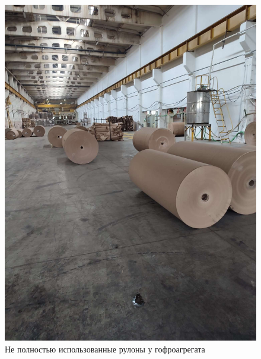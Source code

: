 \begin{figure}
\begin{center}
  \includegraphics[height=0.8\textheight, width=\textwidth, keepaspectratio]{Pics/d_Stock.JPEG}
\end{center}
  \caption{Не полностью использованные рулоны у гофроагрегата}
  \label{pic:d_Stock}
\end{figure}



